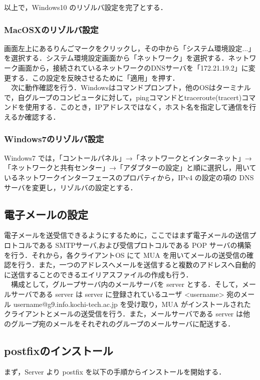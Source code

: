 \documentclass[a4j,titlepage]{jarticle}
\begin{document}
以上で，Windows10 のリゾルバ設定を完了とする．

\subsubsection{MacOSXのリゾルバ設定}
画面左上にあるりんごマークをクリックし，その中から「システム環境設定...」を選択する．システム環境設定画面から「ネットワーク」を選択する．ネットワーク画面から，接続されているネットワークのDNSサーバを「172.21.19.2」に変更する．この設定を反映させるために「適用」を押す．\\
　次に動作確認を行う．Windowsはコマンドプロンプト，他のOSはターミナルで，自グループのコンピュータに対して，pingコマンドとtraceroute(tracert)コマンドを使用する．このとき，IPアドレスではなく，ホスト名を指定して通信を行えるか確認する．

\subsubsection{Windows7のリゾルバ設定}
Windows7 では，「コントールパネル」→「ネットワークとインターネット」→「ネットワークと共有センター」→「アダプターの設定」と順に選択し，用いているネットワークインターフェースのプロパティから，IPv4 の設定の項の DNS サーバを変更し，リゾルバの設定とする．


\subsection{電子メールの設定}
電子メールを送受信できるようにするために，ここではまず電子メールの送信プロトコルである SMTPサーバ,および受信プロトコルである POP サーバの構築を行う．それから，各クライアントOS にて MUA を用いてメールの送受信の確認を行う．また，一つのアドレスへメールを送信すると複数のアドレスへ自動的に送信することのできるエイリアスファイルの作成も行う．\\
　構成として，グループサーバ内のメールサーバを server とする．そして，メールサーバである server は server に登録されているユーザ <username> 宛のメール username@g9.info.kochi-tech.ac.jp を受け取り，MUA がインストールされたクライアントとメールの送受信を行う．また，メールサーバである server は他のグループ宛のメールをそれぞれのグループのメールサーバに配送する．

\subsection{postfixのインストール}
まず，Server より postfix を以下の手順からインストールを開始する．
\end{document}
